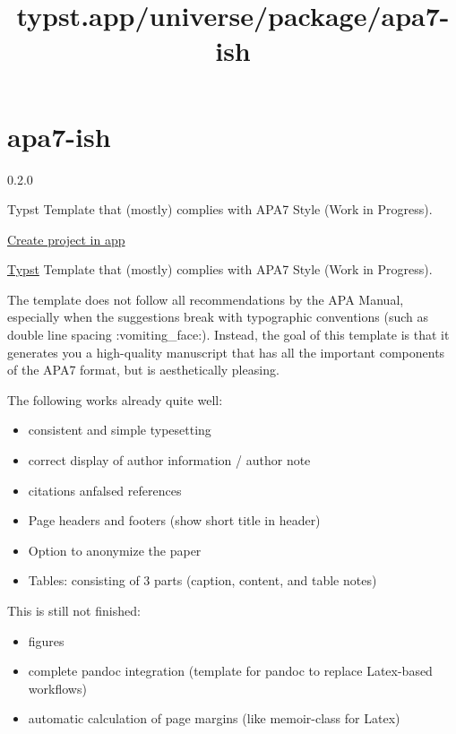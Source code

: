 \title{typst.app/universe/package/apa7-ish}

\label{banner}
\label{template-thumbnail}

\section{apa7-ish}\label{apa7-ish}

{ 0.2.0 }

Typst Template that (mostly) complies with APA7 Style (Work in
Progress).

\href{/app?template=apa7-ish&version=0.2.0}{Create project in app}

\label{readme}
\href{https://typst.app/}{Typst} Template that (mostly) complies with
APA7 Style (Work in Progress).

The template does not follow all recommendations by the APA Manual,
especially when the suggestions break with typographic conventions (such
as double line spacing :vomiting\_face:). Instead, the goal of this
template is that it generates you a high-quality manuscript that has all
the important components of the APA7 format, but is aesthetically
pleasing.

The following works already quite well:

\begin{itemize}
\tightlist
\item
  consistent and simple typesetting
\item
  correct display of author information / author note
\item
  citations anfalsed references
\item
  Page headers and footers (show short title in header)
\item
  Option to anonymize the paper
\item
  Tables: consisting of 3 parts (caption, content, and table notes)
\end{itemize}

This is still not finished:

\begin{itemize}
\tightlist
\item
  figures
\item
  complete pandoc integration (template for pandoc to replace
  Latex-based workflows)
\item
  automatic calculation of page margins (like memoir-class for Latex)
\end{itemize}

